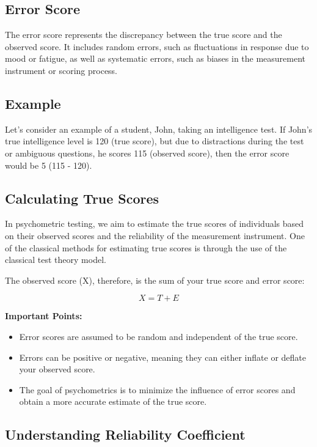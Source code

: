 \documentclass[12pt, a4paper]{exam}
\begin{document}
\subsection{Error Score}

The error score represents the discrepancy between the true score and the observed score. It includes random errors, such as fluctuations in response due to mood or fatigue, as well as systematic errors, such as biases in the measurement instrument or scoring process.

\subsection{Example}

Let’s consider an example of a student, John, taking an intelligence test. If John’s true intelligence level is 120 (true score), but due to distractions during the test or ambiguous questions, he scores 115 (observed score), then the error score would be 5 (115 - 120).

\subsection{Calculating True Scores}

In psychometric testing, we aim to estimate the true scores of individuals based on their observed scores and the reliability of the measurement instrument. One of the classical methods for estimating true scores is through the use of the classical test theory model.

The observed score (X), therefore, is the sum of your true score and error score:

\[ X = T + E \]

\textbf{Important Points:}

\begin{itemize}
    \item Error scores are assumed to be random and independent of the true score.
    \item Errors can be positive or negative, meaning they can either inflate or deflate your observed score.
    \item The goal of psychometrics is to minimize the influence of error scores and obtain a more accurate estimate of the true score.
\end{itemize}


\subsection{Understanding Reliability Coefficient}
\end{document}
